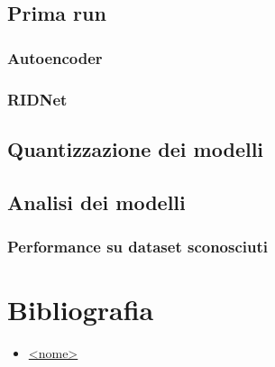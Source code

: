 \documentclass[12pt,a4paper,openright,twoside]{book}
\newcommand{\TODOComment}[1]{}
\begin{document}
\section{Prima run}
\subsection{Autoencoder}


\subsection{RIDNet}

\TODOComment{Aggiungere codice del pnrr}



\section{Quantizzazione dei modelli}
\section{Analisi dei modelli}
\subsection{Performance su dataset sconosciuti}



\chapter{Bibliografia}
\begin{itemize}
    \item \href{<sito>}{<nome>}
\end{itemize}
\end{document}
